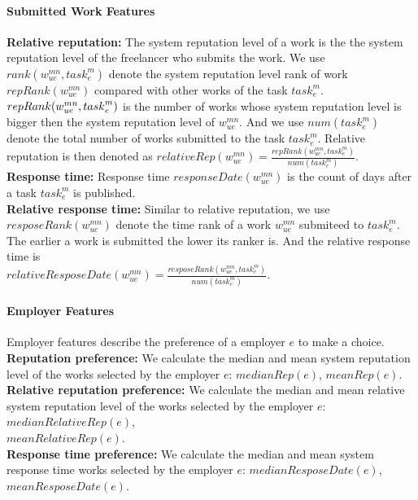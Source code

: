 \documentclass{sig-alternate-05-2015}
\begin{document}
\paragraph{Submitted Work Features} 
\textbf{Relative reputation:} The system reputation level of a work is the the system reputation level of the freelancer who submits the work. We use $rank({w}_{ue}^{mn}, {task}_{e}^{m})$ denote the system reputation level rank of work $repRank({w}_{ue}^{mn})$ compared with other works of the task ${task}_{e}^{m}$. $repRank({w}_{ue}^{mn}, \\{task}_{e}^{m})$ is the number of works whose system reputation level is bigger then the system reputation level of ${w}_{ue}^{mn}$. And we use $num({task}_{e}^{m})$ denote the total number of works submitted to the task ${task}_{e}^{m}$. Relative reputation is then denoted as $relativeRep({w}_{ue}^{mn})=\frac{repRank({w}_{ue}^{mn}, {task}_{e}^{m})}{num({task}_{e}^{m})}$. \\
\textbf{Response time:} Response time $responseDate({w}_{ue}^{mn})$ is the count of days after a task  ${task}_{e}^{m}$ is published. \\
\textbf{Relative response time:} Similar to relative reputation, we use $resposeRank({w}_{ue}^{mn})$ denote the time rank of a work ${w}_{ue}^{mn}$ submiteed to ${task}_{e}^{m}$. The earlier a work is submitted the lower its ranker is. And the relative response time is \\$relativeResposeDate({w}_{ue}^{mn})=\frac{resposeRank({w}_{ue}^{mn}, {task}_{e}^{m})}{num({task}_{e}^{m})}$. \\
\paragraph{Employer Features} Employer features describe the preference of a employer $e$ to make a choice. \\
\textbf{Reputation preference:} We calculate the median and mean system reputation level of the works selected by the employer $e$: 
$medianRep(e)$, $meanRep(e)$. \\
\textbf{Relative reputation preference:} We calculate the median and mean relative system reputation level of the works selected by the employer $e$: $medianRelativeRep(e)$, \\$meanRelativeRep(e)$. \\
\textbf{Response time preference:} We calculate the median and mean system response time works selected by the employer $e$: $medianResposeDate(e)$, \\$meanResposeDate(e)$.\\
\end{document}
